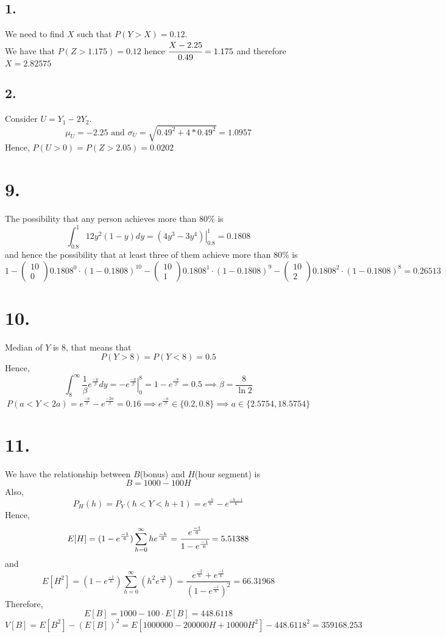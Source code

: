 \documentclass[11pt]{article}
\begin{document}
\subsection*{1.}
We need to find $X$ such that $P(Y>X) = 0.12$. \\
We have that $P(Z>1.175) = 0.12$ hence $\cfrac{X-2.25}{0.49} = 1.175$ and therefore $X= 2.82575 $
\subsection*{2.}
Consider $U = Y_1 - 2Y_2$.
\[
\mu_U = -2.25 \text{ and } \sigma_U = \sqrt{0.49^2 + 4* 0.49^2} = 1.0957
\]
Hence, $P(U>0) = P(Z>2.05) = 0.0202$
\pagebreak
\section*{9.}
The possibility that any person achieves more than 80\% is 
\[
\int_{0.8}^1 12y^2(1-y) dy = \left.\left(4y^3-3y^4\right)\right|_{0.8}^1 = 0.1808
\]
and hence the possibility that at least three of them achieve more than 80\% is 
\[
1- 
\begin{pmatrix}
    10 \\ 0    
\end{pmatrix}
0.1808^0 \cdot (1-0.1808)^{10}
-
\begin{pmatrix}
    10 \\ 1    
\end{pmatrix}
0.1808^1 \cdot (1-0.1808)^9
-
\begin{pmatrix}
    10 \\ 2    
\end{pmatrix}
0.1808^2 \cdot (1-0.1808)^8
= 0.26513
\]
\pagebreak
\section*{10.}
Median of $Y$ is 8, that means that 
\[
P(Y>8) = P(Y<8) = 0.5
\]
Hence, 
\[
\int_8^\infty \frac{1}{\beta} e^{\frac{-y}{\beta}} dy = \left.-e^{\frac{-y}{\beta}}\right|_0^8 = 1 - e^{\frac{-8}{\beta}} = 0.5 \implies \beta = \frac{8}{\ln2}
\]
\[
P(a<Y<2a) = e^{\frac{-a}{\beta}} - e^{\frac{-2a}{\beta}} = 0.16 \implies e^{\frac{-a}{\beta}} \in \{0.2, 0.8\} \implies a \in \{ 2.5754, 18.5754\}
\]
\pagebreak
\section*{11.}
We have the relationship between $B$(bonus) and $H$(hour segment) is 
\[
B = 1000 - 100H
\]
Also,
\[
P_H(h) = P_Y(h<Y<h+1) = e^{\frac{-h}{6}} - e^{\frac{-h-1}{6}}
\]
Hence, 
\[
E[H] = (1-e^{\frac{-1}{6}})\sum_{h=0}^\infty he^{\frac{-h}{6}} = \cfrac{e^{\frac{-1}{6}}}{1-e^{\frac{-1}{6}}} = 5.51388
\]
and 
\[
E[H^2] = (1-e^{\frac{-1}{6}})\sum_{h=0}^\infty \left(h^2e^{\frac{-h}{6}} \right) = \frac{e^{\frac{-2}{6}} + e^{\frac{-1}{6}}}{\left(1-e^\frac{-1}{6}\right)^2} = 66.31968
\]
Therefore, 
\[
  E[B] = 1000 - 100\cdot E[B] = 448.6118
\]
\[
  V[B] = E[B^2] - (E[B])^2 = E[1000000 - 200000H + 10000H^2] -448.6118^2 = 359168.253
\]
\pagebreak
\end{document}
